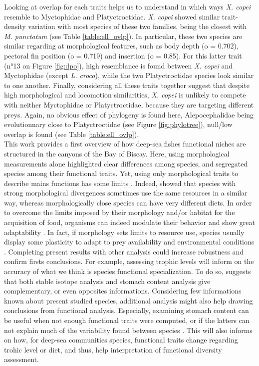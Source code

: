 Looking at overlap for each traits helps us to understand in which ways \textit{X. copei} resemble to Myctophidae and Platyctroctidae. \textit{X. copei} showed similar trait-density variation with most species of these two families, being the closest with \textit{M. punctatum} (see Table \ref{table:ell_ovlp}). In particular, these two species are similar regarding at morphological features, such as body depth (o = 0.702), pectoral fin position (o = 0.719) and insertion (o = 0.85). For this latter trait (n°13 on Figure \ref{fig:dpo}), high resemblance is found between \textit{X. copei} and Myctophidae (except \textit{L. croco}), while the two Platyctroctidae species look similar to one another. Finally, considering all these traits together suggest that despite high morphological and locomotion similarities, \textit{X. copei} is unlikely to compete with neither Myctophidae or Platyctroctidae, because they are targeting different preys. Again, no obvious effect of phylogeny is found here, Alepocephalidae being evolutionnary close to Platyctroctidae (see Figure \ref{fig:phylotree}), null/low overlap is found (see Table \ref{table:ell_ovlp}). \\



This work provides a first overview of how deep-sea fishes functional niches are structured in the canyons of the Bay of Biscay. Here, using morphological measurements alone highlighted clear differences among species, and segregated species among their functional traits. Yet, using only morphological traits to describe mains functions has some limits \citep{dasilva2019}. Indeed, \citet{grossman2009} showed that species with strong morphological divergences sometimes use the same resources in a similar way, whereas morphologically close species can have very different diets. In order to overcome the limits imposed by their morphology and/or habitat for the acquisition of food, organisms can indeed modulate their behavior and show great adaptability \citep{blondel1979,grossman2009}. In fact, if morphology sets limits to resource use, species usually display some plasticity to adapt to prey availability and environmental conditions \citep{ibanez2007,sibbing2000}. Completing present results with other analysis could increase robustness and confirm firsts conclusions. For example, assessing trophic levels will inform on the accuracy of what we think is species functional specialization. To do so, \citet{preciado2017} suggests that both stable isotope analysis and stomach content analysis give complementary, or even opposites informations. Considering few informations known about present studied species, additional analysis might also help drawing conclusions from functional analysis. Especially, examining stomach content can be useful when not enough functional traits were computed, or if the latters can not explain much of the variability found between species \citep{albouy2011}. This will also informs on how, for deep-sea communities species, functional traits change regarding trohic level or diet, and thus, help interpretation of functional diversity assessment. 

